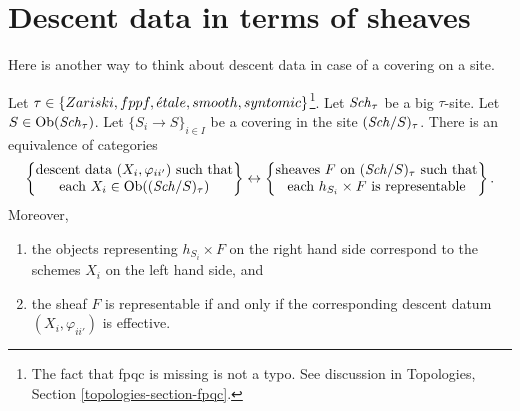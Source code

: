 \section{Descent data in terms of sheaves}
\label{section-descent-data-sheaves}


\noindent
Here is another way to think about descent data
in case of a covering on a site.

\begin{lemma}
\label{lemma-descent-data-sheaves}
Let $\tau \in \{Zariski, fppf, {\acute{e}tale}, smooth, syntomic\}$\footnote{The
fact that fpqc is missing is not a typo. See discussion
in Topologies, Section \ref{topologies-section-fpqc}.}.
Let $\mathit{Sch}_\tau$ be a big $\tau$-site.
Let $S \in \mathop{\mathrm{Ob}}\nolimits(\mathit{Sch}_\tau)$.
Let $\{S_i \to S\}_{i \in I}$ be a covering in the
site $(\mathit{Sch}/S)_\tau$. There is an equivalence of
categories
$$
\left\{
\begin{matrix}
\text{descent data }(X_i, \varphi_{ii'})\text{ such that}\\
\text{each }X_i \in \mathop{\mathrm{Ob}}\nolimits((\mathit{Sch}/S)_\tau)
\end{matrix}
\right\}
\leftrightarrow
\left\{
\begin{matrix}
\text{sheaves }F\text{ on }(\mathit{Sch}/S)_\tau\text{ such that}\\
\text{each }h_{S_i} \times F\text{ is representable}
\end{matrix}
\right\}.
$$
Moreover,
\begin{enumerate}
\item the objects representing $h_{S_i} \times F$ on the right hand side
correspond to the schemes $X_i$ on the left hand side, and
\item the sheaf $F$ is representable if and only if the
corresponding descent datum $(X_i, \varphi_{ii'})$ is effective.
\end{enumerate}
\end{lemma}

